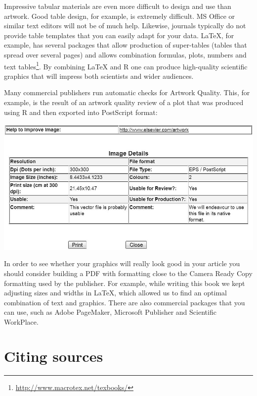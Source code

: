 \documentclass[graybox,envcountchap,sectrefs,UStrade]{svmono}
\begin{document}
Impressive tabular materials are even more difficult to design and use than artwork. Good table design, for example, is extremely difficult. MS Office or similar text editors will not be of much help. Likewise, journals typically do not provide table templates that you can easily adapt for your data. {\LaTeX}, for example, has several packages that allow production of super-tables (tables that spread over several pages) and allows combination formulas, plots, numbers and text tables\footnote{\url{http://www.macrotex.net/texbooks/}}. By combining {\LaTeX} and \textsf{R} one can produce high-quality scientific graphics that will impress both scientists and wider audiences.  \par

Many commercial publishers run automatic checks for Artwork Quality. This, for example, is the result of an artwork quality review of a plot that was produced using \textsf{R} and then exported into PostScript format:

\medskip
\begin{center}
  \includegraphics[width=.9\textwidth]{Fig_screen_artwork_check.jpg}
\end{center}

In order to see whether your graphics will really look good in your article you should consider building a PDF with formatting close to the Camera Ready Copy formatting used by the publisher. For example, while writing this book we kept adjusting sizes and widths in {\LaTeX}, which allowed us to find an optimal combination of text and graphics. There are also commercial packages that you can use, such as \textsf{Adobe PageMaker}, \textsf{Microsoft Publisher} and \textsf{Scientific WorkPlace}. \par


\section{Citing sources}
\end{document}
